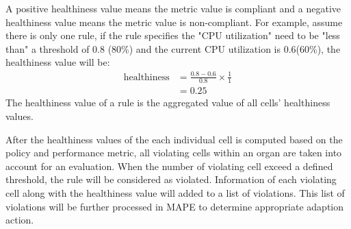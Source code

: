 \documentclass{seal_thesis}
\begin{document}
A positive healthiness value means the metric value is compliant and a negative healthiness value means the metric value is non-compliant.
For example, assume there is only one rule, if the rule specifies the "CPU utilization" need to be "less than" a threshold of 0.8 (80\%) and the current CPU utilization is 0.6(60\%), the healthiness value will be:
\begin{align*}
\textrm{healthiness} &= \frac{0.8 - 0.6}{0.8} \times \frac{1}{1}\\
&= 0.25
\end{align*}
The healthiness value of a rule is the aggregated value of all cells' healthiness values.

After the healthiness values of the each individual cell is computed based on the policy and performance metric, all violating cells within an organ are taken into account for an evaluation.
When the number of violating cell exceed a defined threshold, the rule will be considered as violated.
Information of each violating cell along with the healthiness value will added to a list of violations.
This list of violations will be further processed in MAPE to determine appropriate adaption action.

\end{document}
